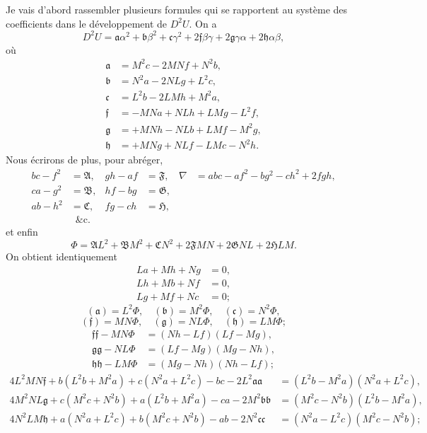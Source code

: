 \documentclass[11pt]{article}
\begin{document}
\smallskip
Je vais d'abord rassembler plusieurs formules qui se rapportent au syst\`eme des
coefficients dans le d\'eveloppement de $D^{2} U$. On a
\[
D^{2} U = \mathfrak{a}\alpha^{2} + \mathfrak{b}\beta^{2} + \mathfrak{c}\gamma^{2} + 2\mathfrak{f}\beta\gamma + 2\mathfrak{g}\gamma\alpha + 2\mathfrak{h}\alpha\beta,
\]
o\`u
\begin{align*}
\mathfrak{a} &= M^{2} c - 2 M N f + N^{2} b,\\
\mathfrak{b} &= N^{2} a - 2 N L g + L^{2} c,\\
\mathfrak{c} &= L^{2} b - 2 L M h + M^{2} a,\\
\mathfrak{f} &= -M N a + N L h + L M g - L^{2} f,\\
\mathfrak{g} &= +M N h - N L b + L M f - M^{2} g,\\
\mathfrak{h} &= +M N g + N L f - L M c - N^{2} h.
\end{align*}
Nous \'ecrirons de plus, pour abr\'eger,
\begin{align*}
b c - f^{2} &= \mathfrak{A}, & g h - a f &= \mathfrak{F}, & \nabla &= a b c - a f^{2} - b g^{2} - c h^{2} + 2 f g h,\\
c a - g^{2} &= \mathfrak{B}, & h f - b g &= \mathfrak{G},\\
a b - h^{2} &= \mathfrak{C}, & f g - c h &= \mathfrak{H},\\
&\,\,\,\&\text{c.}
\end{align*}
et enfin
\[
\Phi = \mathfrak{A} L^{2} + \mathfrak{B} M^{2} + \mathfrak{C} N^{2} + 2 \mathfrak{F} M N + 2 \mathfrak{G} N L + 2 \mathfrak{H} L M.
\]
On obtient identiquement
\begin{align*}
L a + M h + N g &= 0,\\
L h + M b + N f &= 0,\\
L g + M f + N c &= 0;
\end{align*}
\[
(\mathfrak{a}) = L^{2}\Phi, \quad (\mathfrak{b}) = M^{2}\Phi, \quad (\mathfrak{c}) = N^{2}\Phi,
\]
\[
(\mathfrak{f}) = M N\Phi, \quad (\mathfrak{g}) = N L\Phi, \quad (\mathfrak{h}) = L M\Phi;
\]
\begin{align*}
\mathfrak{f}\mathfrak{f} - M N\Phi &= (N h - L f)(L f - M g),\\
\mathfrak{g}\mathfrak{g} - N L\Phi &= (L f - M g)(M g - N h),\\
\mathfrak{h}\mathfrak{h} - L M\Phi &= (M g - N h)(N h - L f);
\end{align*}
\begin{align*}
4 L^{2} M N\mathfrak{f} + b(L^{2} b + M^{2} a) + c(N^{2} a + L^{2} c) - b c - 2 L^{2}\mathfrak{a}\mathfrak{a} &= (L^{2} b - M^{2} a)(N^{2} a + L^{2} c),\\
4 M^{2} N L\mathfrak{g} + c(M^{2} c + N^{2} b) + a(L^{2} b + M^{2} a) - c a - 2 M^{2}\mathfrak{b}\mathfrak{b} &= (M^{2} c - N^{2} b)(L^{2} b - M^{2} a),\\
4 N^{2} L M\mathfrak{h} + a(N^{2} a + L^{2} c) + b(M^{2} c + N^{2} b) - a b - 2 N^{2}\mathfrak{c}\mathfrak{c} &= (N^{2} a - L^{2} c)(M^{2} c - N^{2} b);
\end{align*}
\end{document}
